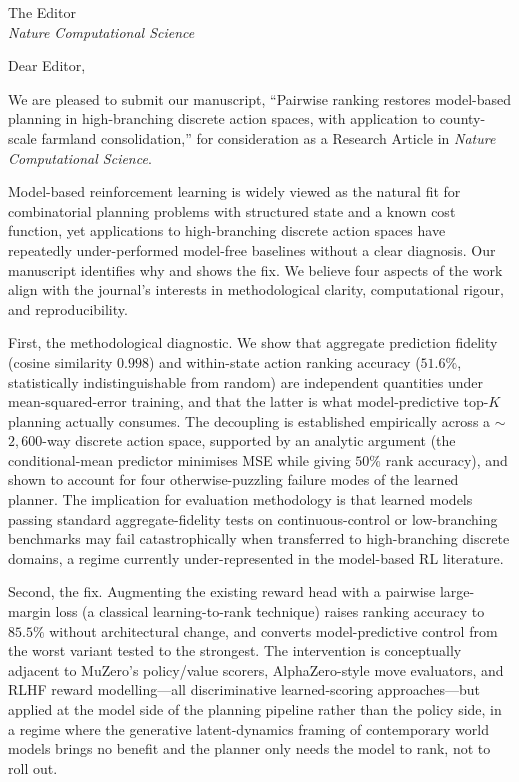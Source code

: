 \documentclass[11pt]{letter}
\begin{document}
\begin{letter}{The Editor \\ \textit{Nature Computational Science}}

\opening{Dear Editor,}

We are pleased to submit our manuscript, ``Pairwise ranking restores model-based planning in high-branching discrete action spaces, with application to county-scale farmland consolidation,'' for consideration as a Research Article in \textit{Nature Computational Science}.

Model-based reinforcement learning is widely viewed as the natural fit for combinatorial planning problems with structured state and a known cost function, yet applications to high-branching discrete action spaces have repeatedly under-performed model-free baselines without a clear diagnosis. Our manuscript identifies why and shows the fix. We believe four aspects of the work align with the journal's interests in methodological clarity, computational rigour, and reproducibility.

First, the methodological diagnostic. We show that aggregate prediction fidelity (cosine similarity $0.998$) and within-state action ranking accuracy ($51.6\%$, statistically indistinguishable from random) are independent quantities under mean-squared-error training, and that the latter is what model-predictive top-$K$ planning actually consumes. The decoupling is established empirically across a $\sim$$2{,}600$-way discrete action space, supported by an analytic argument (the conditional-mean predictor minimises MSE while giving $50\%$ rank accuracy), and shown to account for four otherwise-puzzling failure modes of the learned planner. The implication for evaluation methodology is that learned models passing standard aggregate-fidelity tests on continuous-control or low-branching benchmarks may fail catastrophically when transferred to high-branching discrete domains, a regime currently under-represented in the model-based RL literature.

Second, the fix. Augmenting the existing reward head with a pairwise large-margin loss (a classical learning-to-rank technique) raises ranking accuracy to $85.5\%$ without architectural change, and converts model-predictive control from the worst variant tested to the strongest. The intervention is conceptually adjacent to MuZero's policy/value scorers, AlphaZero-style move evaluators, and RLHF reward modelling---all discriminative learned-scoring approaches---but applied at the model side of the planning pipeline rather than the policy side, in a regime where the generative latent-dynamics framing of contemporary world models brings no benefit and the planner only needs the model to rank, not to roll out.


\end{letter}
\end{document}
